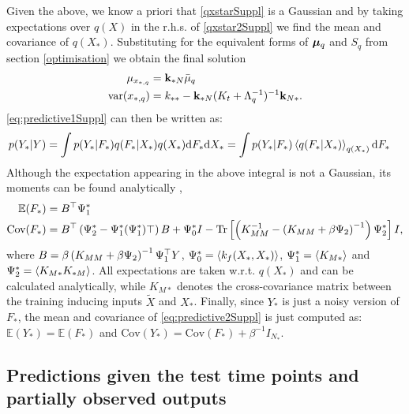Given the above, we know a priori that \eqref{qxstarSuppl} is a Gaussian and by taking expectations over $q(X)$ in the r.h.s. of \eqref{qxstar2Suppl} we find the mean and covariance of $q(X_*)$. Substituting for the equivalent forms of $\boldsymbol \mu_q$ and $S_q$ from section \ref{optimisation} we obtain the final solution
%
\begin{align}
 \mu_{x_{*,q}} = {}& \mathbf{k}_{*N} \bar{\mu}_q \\
  \text{var}(x_{*,q}) = {}& k_{**} - \mathbf{k}_{*N} (K_t + \Lambda_q^{-1})^{-1} \mathbf{k}_{N*}.
\end{align}
%
\eqref{eq:predictive1Suppl} can then be written as:
\begin{align} 
p(Y_*| Y) {}& =  \int p(Y_*| F_*)  q(F_*|X_*) q(X_*) \text{d}  F_* \text{d}  X_* = \int p(Y_* | F_*) \left\langle q(F_* | X_*) \right\rangle_{q(X_*)} \text{d}  F_* \label{eq:predictive2Suppl}
\end{align}
%
Although the expectation appearing in the above integral is not a Gaussian, its moments can be found analytically \cite{rasmussen-williams, Girard03gaussianprocess},
%
\begin{align}
 \mathbb{E}(F_*) ={}&  B^{\top} \Psi_1^* \label{meanFstarSuppl} \\
 \text{Cov}(F_*) ={}& B^{\top} \left( \Psi_2^* - \Psi_1^* (\Psi_1^*){\top} \right) B + \Psi_0^* I - \text{Tr} \left[ \left( K_{MM}^{-1} - \left( K_{MM} + \beta \Psi_2 \right)^{-1} \right) \Psi_2^* \right] I,
\end{align}
%
where $B = \beta \left( K_{MM} + \beta \Psi_2 \right)^{-1} \Psi_1^{\top}
Y$, $\Psi_0^* = \left\langle k_f(X_*, X_*) \right\rangle$, $\Psi_1^* = \left\langle K_{M*} \right\rangle$
and $\Psi_2^* = \left\langle K_{M*} K_{*M} \right\rangle$. All expectations are taken
w.r.t. $q(X_*)$ and can be calculated analytically, while $K_{M*}$
denotes the cross-covariance matrix between the training inducing
inputs $\tilde{X}$ and $X_*$. Finally, since $Y_*$ is just a noisy version of
$F_*$, the mean and covariance of \eqref{eq:predictive2Suppl} is just
computed as: $\mathbb{E}(Y_*) = \mathbb{E}(F_*)$ and $\text{Cov}(Y_*)
= \text{Cov}(F_*) + \beta^{-1} I_{N_*}$.


\subsection{Predictions given the test time points and partially observed outputs}

